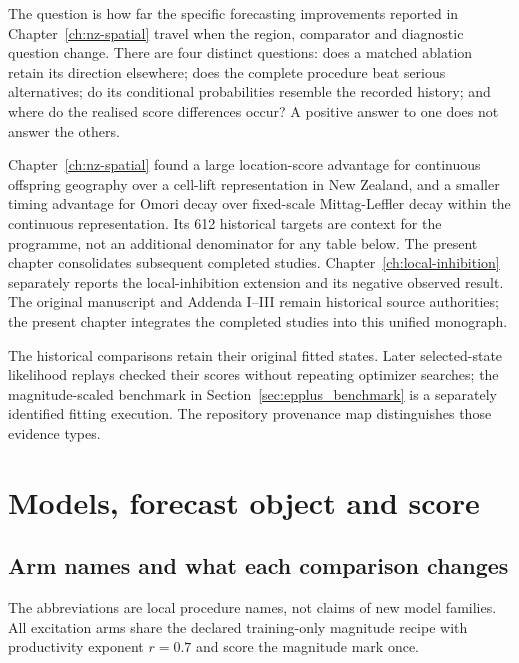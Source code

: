The question is how far the specific forecasting improvements reported in Chapter~\ref{ch:nz-spatial} travel when the region, comparator and diagnostic question change. There are four distinct questions: does a matched ablation retain its direction elsewhere; does the complete procedure beat serious alternatives; do its conditional probabilities resemble the recorded history; and where do the realised score differences occur? A positive answer to one does not answer the others.

Chapter~\ref{ch:nz-spatial} found a large location-score advantage for continuous offspring geography over a cell-lift representation in New Zealand, and a smaller timing advantage for Omori decay over fixed-scale Mittag-Leffler decay within the continuous representation. Its 612 historical targets are context for the programme, not an additional denominator for any table below. The present chapter consolidates subsequent completed studies. Chapter~\ref{ch:local-inhibition} separately reports the local-inhibition extension and its negative observed result. The original manuscript and Addenda I--III remain historical source authorities; the present chapter integrates the completed studies into this unified monograph.

The historical comparisons retain their original fitted states. Later
selected-state likelihood replays checked their scores without repeating
optimizer searches; the magnitude-scaled benchmark in
Section~\ref{sec:epplus_benchmark} is a separately identified fitting execution.
The repository provenance map distinguishes those evidence types.

\section{Models, forecast object and score}

\subsection{Arm names and what each comparison changes}

The abbreviations are local procedure names, not claims of new model families. All excitation arms share the declared training-only magnitude recipe with productivity exponent $r=0.7$ and score the magnitude mark once.

